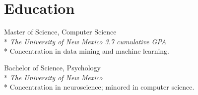 \documentclass[print]{friggeri-cv} %
\begin{document}
  \iftoggle{cv}{
\begin{description}
  \item  {\largeheaderfont Student Volunteer } {\smallheaderfont \hfill 2008\textemdash 2010} \\*
    {\footnotesize \emph{The Mind Research Network, Albuquerque, NM}} \hfill \\*
    Assisted with a study ran by Pilar Sanjuan, PhD investigating substance use
    and post-traumatic stress disorder (PTSD) in recently returned combat
    veterans. \\*
\end{description}


\begin{description}
  \item  {\largeheaderfont Student Volunteer}  \hfill {\smallheaderfont 2008 } \\*
    {\footnotesize \emph{The University of New Mexico, Albuquerque, NM}\textemdash } \\*
    Assisted Akaysha Tang, PhD, with a study investigating stress regulation in
    rats and assisted an expert in troubleshooting and repairing an EEG system
    for a study investigating stress in humans.\\*
\end{description}
}{}

\section{Education}
\begin{description}
  \item {\largeheaderfont Master of Science, Computer Science}  \hfill 
    {} \\*
    {\footnotesize \emph{The University of New Mexico  \hfill 3.7 cumulative GPA}} \\*
    Concentration in data mining and machine learning.
\end{description}
\begin{description}
  \item  {\largeheaderfont Bachelor of Science, Psychology } \hfill
    { }\\*
    {\footnotesize \emph{The University of New Mexico  }} \\*
    Concentration in neuroscience; minored in computer science.
\end{description}
\end{document}
